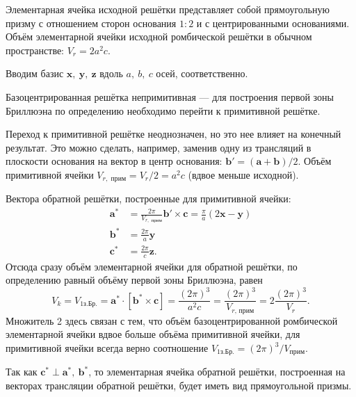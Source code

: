 \documentclass[a4paper]{article}
\begin{document}
\begin{hiProb}[Т1-1]
\end{hiProb}
\begin{sol}
\begin{figure}[ht]
    \centering
    \caption{}
    \label{fig:4}
\end{figure}
Элементарная ячейка исходной решётки представляет собой
прямоугольную призму с отношением сторон основания $1:2$ 
и с центрированными основаниями. Объём элементарной ячейки
исходной ромбической решётки в обычном пространстве:
$V_r =2a^2 c$.

Вводим базис $\mathbf{x},\ \mathbf{y},\ \mathbf{z}$ вдоль
$a,\ b,\ c$ осей, соответственно.

Базоцентрированная решётка непримитивная --- для
построения первой зоны Бриллюэна по определению необходимо
перейти к примитивной решётке.

Переход к примитивной решётке неоднозначен, но это
нее влияет на конечный результат. Это можно сделать, например,
 заменив одну из трансляций в плоскости основания на вектор
 в центр основания: $\mathbf{b}'= (\mathbf{a}+\mathbf{b}) /2$.
 Объём примитивной ячейки $V_{r,\text{ прим}}=V_r /2=
 a^2 c$ (вдвое меньше исходной).

Вектора обратной решётки, построенные для примитивной ячейки:
\begin{align*}
	\mathbf{a}^*&= \frac{2\pi}{V_{r,\text{ прим}}}
	\mathbf{b}' \times \mathbf{c}=\frac{\pi}{a}(2\mathbf{x}-\mathbf{y})\\
	\mathbf{b}^*&= \frac{2\pi}{a}\mathbf{y} \\
	\mathbf{c}^*&= \frac{2\pi}{c}\mathbf{z}
.\end{align*}
Отсюда сразу объём элементарной ячейки для обратной решётки,
по определению равный объёму первой зоны Бриллюэна,
равен 
\[
	V_k=V_{1\text{з.Бр.}}= \mathbf{a}^*\cdot\left[ 
	\mathbf{b}^* \times \mathbf{c}\right] =
	\frac{(2\pi)^3}{a^2 c}= \frac{\left( 2\pi \right) ^3}{
	V_{r \text{, прим}}}=2 \frac{(2\pi)^3}{V_r}
.\] 
Множитель 2 здесь связан с тем, что объём базоцентрированной
ромбической элементарной ячейки вдвое больше объёма примитивной ячейки, для примитивной ячейки всегда верно соотношение
$V_{\text{1з.Бр.}}=(2\pi)^3 /V_\text{прим}$.

Так как $\mathbf{c}^*\perp \mathbf{a}^*,\ \mathbf{b}^*$,
то элементарная ячейка обратной решётки, построенная на
векторах трансляции обратной решётки, будет иметь вид
прямоугольной призмы.


\end{sol}
\end{document}
